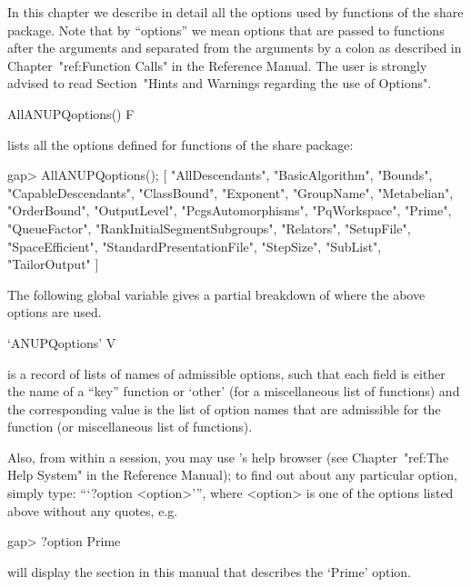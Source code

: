 

In this chapter we describe in detail all the options used  by  functions
of the {\ANUPQ} share package. Note that by ``options''  we  mean  {\GAP}
options that are passed to functions after the  arguments  and  separated
from the arguments by  a  colon  as  described  in  Chapter~"ref:Function
Calls" in the Reference Manual. The user  is  strongly  advised  to  read
Section~"Hints and Warnings regarding the use of Options".

\>AllANUPQoptions() F

lists all the {\GAP} options defined for functions of the {\ANUPQ}  share
package:

\beginexample
gap> AllANUPQoptions();
[ "AllDescendants", "BasicAlgorithm", "Bounds", "CapableDescendants", 
  "ClassBound", "Exponent", "GroupName", "Metabelian", "OrderBound", 
  "OutputLevel", "PcgsAutomorphisms", "PqWorkspace", "Prime", "QueueFactor", 
  "RankInitialSegmentSubgroups", "Relators", "SetupFile", "SpaceEfficient", 
  "StandardPresentationFile", "StepSize", "SubList", "TailorOutput" ]
\endexample

The following global variable gives a  partial  breakdown  of  where  the
above options are used.

\>`ANUPQoptions' V

is a record of lists of names of admissible {\ANUPQ} options, such  that
each field is either the name of a ``key'' {\ANUPQ} function  or  `other'
(for a miscellaneous list of functions) and the  corresponding  value  is
the list of option  names  that  are  admissible  for  the  function  (or
miscellaneous list of functions).

Also, from within a {\GAP} session, you may  use  {\GAP}'s  help  browser
(see Chapter~"ref:The Help System" in the {\GAP}  Reference  Manual);  to
find out about any particular {\ANUPQ} option,  simply  type:  ```?option
<option>''', where <option> is one of the options  listed  above  without
any quotes, e.g.

\begintt
gap> ?option Prime
\endtt

will display the section  in  this  manual  that  describes  the  `Prime'
option.

